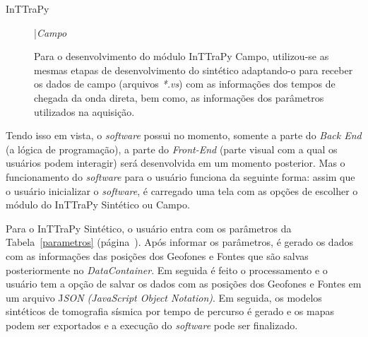 \documentclass[a4paper, 12 pt]{article} %
\begin{document}
\begin{description}
	\item[InTTraPy] |\textit{Campo} 
	
	\hspace{0.5cm} Para o desenvolvimento do módulo InTTraPy Campo, utilizou-se as mesmas etapas de desenvolvimento do sintético adaptando-o para receber os dados de campo (arquivos \textit{*.vs}) com as informações dos tempos de chegada da onda direta, bem como, as informações dos parâmetros utilizados na aquisição.
	
\end{description}

Tendo isso em vista, o \textit{software} possui no momento, somente a parte do \textit{Back End} (a lógica de programação), a parte do \textit{Front-End} (parte visual com a qual os usuários podem interagir) será desenvolvida em um momento posterior. Mas o funcionamento do \textit{software} para o usuário funciona da seguinte forma: assim que o usuário inicializar o \textit{software}, é carregado uma tela com as opções de escolher o módulo do InTTraPy Sintético ou Campo. 

Para o InTTraPy Sintético, o usuário entra com os parâmetros da Tabela~\ref{parametros} (página~\pageref{parametros}). Após informar os parâmetros, é gerado os dados com as informações das posições dos Geofones e Fontes que são salvas posteriormente no \textit{DataContainer}. Em seguida é feito o processamento e o usuário tem a opção de salvar os dados com as posições dos Geofones e Fontes em um arquivo J\textit{SON (JavaScript Object Notation)}. Em seguida, os modelos sintéticos de tomografia sísmica por tempo de percurso é gerado e os mapas podem ser exportados e a execução do \textit{software} pode ser finalizado.
 
\end{document}
